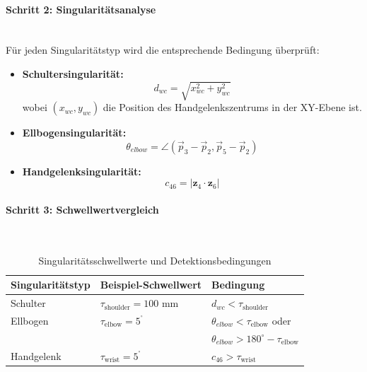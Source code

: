 \paragraph{Schritt 2: Singularitätsanalyse}~\\
Für jeden Singularitätstyp wird die entsprechende Bedingung überprüft:
\begin{itemize}
  \item \textbf{Schultersingularität:}
    \begin{equation}
      d_{wc} = \sqrt{x_{wc}^2 + y_{wc}^2}
    \end{equation}
    wobei $(x_{wc}, y_{wc})$ die Position des Handgelenkszentrums in
    der XY-Ebene ist.

  \item \textbf{Ellbogensingularität:}
    \begin{equation}
      \theta_{elbow} = \angle(\vec{p}_3 - \vec{p}_2, \vec{p}_5 - \vec{p}_2)
    \end{equation}

  \item \textbf{Handgelenksingularität:}
    \begin{equation}
      c_{46} = |\mathbf{z}_4 \cdot \mathbf{z}_6|
    \end{equation}
\end{itemize}

\paragraph{Schritt 3: Schwellwertvergleich}~\\
\begin{table}[H]
  \centering
  \begin{tabular}{l l l}
    \hline
    \textbf{Singularitätstyp} & \textbf{Beispiel-Schwellwert}      &
    \textbf{Bedingung}                            \\
    \hline
    Schulter                  & $\tau_{\text{shoulder}} = 100$ mm  &
    $d_{wc} < \tau_{\text{shoulder}}$             \\
    Ellbogen                  & $\tau_{\text{elbow}} = 5^{^\circ}$ &
    $\theta_{elbow} < \tau_{\text{elbow}}$ oder   \\
    &                                    & $\theta_{elbow} >
    180^\circ - \tau_{\text{elbow}}$ \\
    Handgelenk                & $\tau_{\text{wrist}} = 5^{^\circ}$ &
    $c_{46} > \tau_{\text{wrist}}$                \\
    \hline
  \end{tabular}
  \caption{Singularitätsschwellwerte und Detektionsbedingungen}
  \label{tab:singularity_thresholds}
\end{table}

